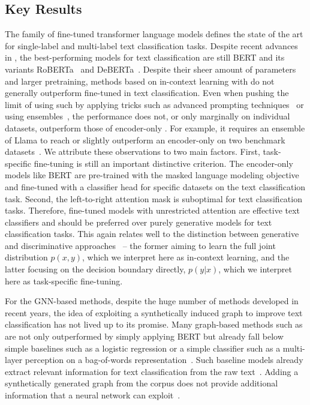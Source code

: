 \subsection{Key Results}
The family of fine-tuned transformer language models defines the state of the art for single-label and multi-label text classification tasks.
Despite recent advances in \LLMs, the best-performing models for text classification are still \SLMs BERT and its variants RoBERTa~\cite{liu_roberta:_2019} and DeBERTa~\cite{he_deberta_2021}.
Despite their sheer amount of parameters and larger pretraining, methods based on in-context learning with \LLMs do not generally outperform fine-tuned \SLMs in text classification.
Even when pushing the limit of using such \GenLMs by applying tricks such as advanced prompting techniques~\cite{carp} or using ensembles~\cite{DBLP:journals/corr/abs-2402-07470-pushing-the-limit}, the performance does not, or only marginally on individual datasets, outperform those of encoder-only \SLMs. 
For example, it requires an ensemble of Llama \LLMs to reach or slightly outperform an encoder-only \SLM on two benchmark datasets~\cite{DBLP:journals/corr/abs-2402-07470-pushing-the-limit}.
We attribute these observations to two main factors.
First, task-specific fine-tuning is still an important distinctive criterion.
The encoder-only models like BERT are pre-trained with the masked language modeling objective and fine-tuned with a classifier head for specific datasets on the text classification task.
Second, the left-to-right attention mask is suboptimal for text classification tasks.
Therefore, fine-tuned models with unrestricted attention are effective text classifiers and should be preferred over purely generative models for text classification tasks.
This again relates well to the distinction between generative and discriminative approaches~\cite{DBLP:conf/sigir/Nallapati04} -- the former aiming to learn the full joint distribution $p(x,y)$, which we interpret here as in-context learning, and the latter focusing on the decision boundary directly, \ie $p(y|x)$, which we interpret here as task-specific fine-tuning.

For the GNN-based methods, despite the huge number of methods developed in recent years, the idea of exploiting a synthetically induced graph to improve text classification has not lived up to its promise.
Many graph-based methods such as \cite{DBLP:conf/aaai/YaoM019,DBLP:conf/aaai/LiuYZWL20,DBLP:conf/wsdm/RageshSIBL21} are not only outperformed by simply applying BERT but already fall below simple baselines such as a logistic regression or a simple classifier such as a multi-layer perception on a bag-of-words representation~\cite{galkescherp-acl2022,DBLP:conf/wsdm/RageshSIBL21}.
Such baseline models already extract relevant information for text classification from the raw text~\cite{DBLP:journals/csur/Sebastiani02}.
Adding a synthetically generated graph from the corpus does not provide additional information that a neural network can exploit~\cite{galkescherp-acl2022}.

